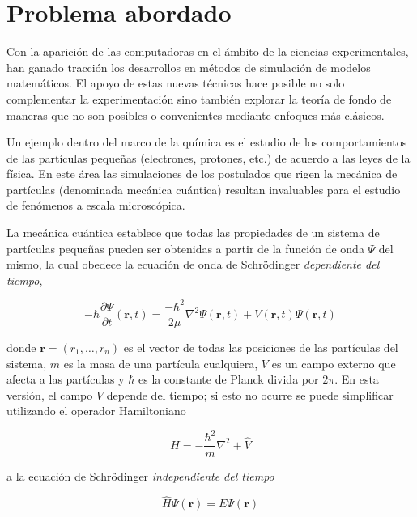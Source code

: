 \section{Problema abordado}

Con la aparici\'on de las computadoras en el \'ambito de la ciencias experimentales, han
ganado tracci\'on los desarrollos en m\'etodos de simulaci\'on de modelos matem\'aticos.
El apoyo de estas nuevas t\'ecnicas hace posible no solo
complementar la experimentaci\'on sino tambi\'en explorar la teor\'ia de fondo de maneras que
no son posibles o convenientes mediante enfoques m\'as cl\'asicos.

Un ejemplo dentro del marco de la qu\'imica es el estudio de los comportamientos de las
part\'iculas peque\~nas (electrones, protones, etc.) de acuerdo a las leyes de la f\'isica. En este \'area las
simulaciones de los postulados que rigen la mec\'anica de part\'iculas (denominada mec\'anica cu\'antica)
resultan invaluables para el estudio de fen\'omenos a escala microsc\'opica.

La mec\'anica cu\'antica establece que todas las propiedades de un sistema de part\'iculas peque\~nas
pueden ser obtenidas a partir de la funci\'on de onda $\Psi$ del mismo, la cual obedece la
ecuaci\'on de onda de Schr\"odinger \textit{dependiente del tiempo},

\begin{equation}
    \label{schro_time_dep}
    -\hbar\frac{\partial \Psi}{\partial t} (\mathbf{r},t) = \frac{-\hbar^2}{2\mu}\nabla^2 \Psi(\mathbf{r},t) + V(\mathbf{r},t) \Psi(\mathbf{r},t)
\end{equation}

donde $\mathbf{r} = (r_1,\dots,r_n)$ es el vector de todas las posiciones de las part\'iculas del sistema,
$m$ es la masa de una part\'icula cualquiera, $V$ es un campo externo que afecta a las part\'iculas y
$\hbar$ es la constante de Planck divida por $2\pi$. En esta versi\'on, el campo $V$ depende del tiempo; si
esto no ocurre se puede simplificar utilizando el operador Hamiltoniano

\begin{equation*}
    \hat{H} =  -\frac{\hbar^2}{m} \nabla^2 + \hat{V}
\end{equation*}

a la ecuaci\'on de Schr\"odinger \textit{independiente del tiempo}

\begin{equation}
    \label{schro_time_indep}
    \hat{H} \Psi(\mathbf{r}) = E \Psi(\mathbf{r})
\end{equation}


